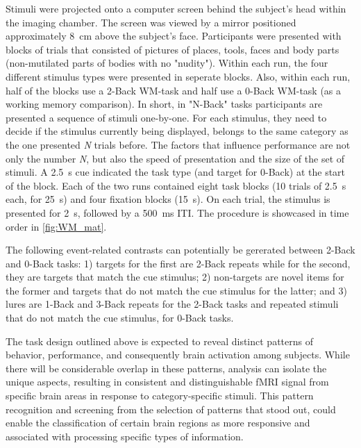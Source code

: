 Stimuli were projected onto a computer screen behind the subject's head within the imaging chamber. The screen was viewed by a mirror positioned approximately \SI{8}{\centi\meter} above the subject's face. Participants were presented with blocks of trials that consisted of pictures of places, tools, faces and body parts (non-mutilated parts of bodies with no "nudity"). Within each run, the four different stimulus types were presented in seperate blocks. Also, within each run, half of the blocks use a 2-Back \gls{WM}-task and half use a 0-Back \gls{WM}-task (as a working memory comparison). In short, in "N-Back" tasks participants are presented a sequence of stimuli one-by-one. For each stimulus, they need to decide if the stimulus currently being displayed, belongs to the same category as the one presented \textit{N} trials before. The factors that influence performance are not only the number \textit{N}, but also the speed of presentation and the size of the set of stimuli. A \SI{2.5}{\second} cue indicated the task type (and target for 0-Back) at the start of the block. Each of the two runs contained eight task blocks (10 trials of \SI{2.5}{\second} each, for \SI{25}{\second}) and four fixation blocks (\SI{15}{\second}). On each trial, the stimulus is presented for \SI{2}{\second}, followed by a \SI{500}{\milli\second} \gls{ITI}. The procedure is showcased in time order in \autoref{fig:WM_mat}.

The following event-related contrasts can potentially be gererated between 2-Back and 0-Back tasks: 1) targets for the first are 2-Back repeats while for the second, they are targets that match the cue stimulus; 2) non-targets are novel items for the former and targets that do not match the cue stimulus for the latter; and 3) lures are 1-Back and 3-Back repeats for the 2-Back tasks and repeated stimuli that do not match the cue stimulus, for 0-Back tasks.

The task design outlined above is expected to reveal distinct patterns of behavior, performance, and consequently brain activation among subjects. While there will be considerable overlap in these patterns, analysis can isolate the unique aspects, resulting in consistent and distinguishable \gls{fMRI} signal from specific brain areas in response to category-specific stimuli. This pattern recognition and screening from the selection of patterns that stood out, could enable the classification of certain brain regions as more responsive and associated with processing specific types of information.


